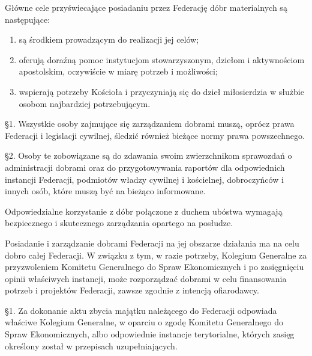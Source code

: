 Główne cele przyświecające posiadaniu przez Federację dóbr materialnych są następujące:


\begin{enumerate}


\item są środkiem prowadzącym do realizacji jej celów;


\item oferują doraźną pomoc instytucjom stowarzyszonym, dziełom i aktywnościom apostolskim, oczywiście w miarę potrzeb i możliwości;


\item wspierają potrzeby Kościoła i przyczyniają się do dzieł miłosierdzia w służbie osobom najbardziej potrzebującym.


\end{enumerate}
 


\filbreak{}


 \S{}1. Wszystkie osoby zajmujące się zarządzaniem dobrami muszą, oprócz prawa Federacji i legislacji cywilnej, śledzić również bieżące normy prawa powszechnego.


\S{}2. Osoby te zobowiązane są do zdawania swoim zwierzchnikom sprawozdań o administracji dobrami oraz do przygotowywania raportów dla odpowiednich instancji Federacji, podmiotów władzy cywilnej i kościelnej, dobroczyńców i innych osób, które muszą być na bieżąco informowane.




 Odpowiedzialne korzystanie z dóbr połączone z duchem ubóstwa wymagają bezpiecznego i skutecznego zarządzania opartego na posłudze.




 Posiadanie i zarządzanie dobrami Federacji na jej obszarze działania ma na celu dobro całej Federacji. W związku z tym, w razie potrzeby, Kolegium Generalne za przyzwoleniem Komitetu Generalnego do Spraw Ekonomicznych i po zasięgnięciu opinii właściwych instancji, może rozporządzać dobrami w celu finansowania potrzeb i projektów Federacji, zawsze zgodnie z intencją ofiarodawcy.
 


 \S{}1. Za dokonanie aktu zbycia majątku należącego do Federacji odpowiada właściwe Kolegium Generalne, w oparciu o zgodę Komitetu Generalnego do Spraw Ekonomicznych, albo odpowiednie instancje terytorialne, których zasięg określony został w przepisach uzupełniających.


